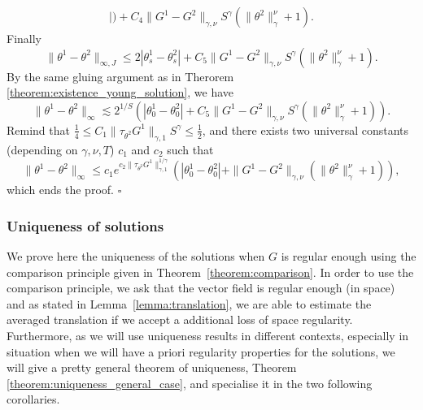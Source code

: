 \documentclass[a4paper,11pt]{article}
\newenvironment{proof}{{\sc Proof.}}{\hfill$\square$}
\begin{document}
\begin{proof}
\begin{eqnarray*}
    | ) +C_{4} \| G^{1} -G^{2} \|_{\gamma , \nu} S^{\gamma} ( \| \theta^{2}
    \|^{\nu}_{\gamma} +1 ) .
  \end{eqnarray*}
  Finally
  \[ \| \theta^{1} - \theta^{2} \|_{\infty ,J} \leqslant 2 | \theta^{1}_{s} -
     \theta^{2}_{s} | +C_{5} \| G^{1} -G^{2} \|_{\gamma , \nu} S^{\gamma} ( \|
     \theta^{2} \|^{\nu}_{\gamma} +1 ) . \]
  By the same gluing argument as in Therorem
  \ref{theorem:existence_young_solution}, we have
  \[ \| \theta^{1} - \theta^{2} \|_{\infty} \lesssim 2^{1/S} ( |
     \theta^{1}_{0} - \theta^{2}_{0} | +C_{5} \| G^{1} -G^{2} \|_{\gamma ,
     \nu} S^{\gamma} ( \| \theta^{2} \|^{\nu}_{\gamma} +1 ) ) . \]
  Remind that $\frac{1}{4} \leqslant C_{1} \| \tau_{\theta^{2}} G^{1}
  \|_{\gamma ,1} S^{\gamma} \leqslant \frac{1}{2}$, and there exists two
  universal constants (depending on $\gamma , \nu ,T$) $c_{1}$ and $c_{2}$
  such that
  \[ \| \theta^{1} - \theta^{2} \|_{\infty} \leqslant c_{1} e^{c_{2} \|
     \tau_{\theta^{2}} G^{1} \|_{\gamma ,1}^{1/ \gamma}} ( | \theta^{1}_{0} -
     \theta^{2}_{0} | + \| G^{1} -G^{2} \|_{\gamma , \nu} ( \| \theta^{2}
     \|^{\nu}_{\gamma} +1 ) ), \]
  which ends the proof.
\end{proof}

\subsubsection{Uniqueness of solutions}

We prove here the uniqueness of the solutions when $G$ is regular enough using
the comparison principle given in Theorem~\ref{theorem:comparison}. In order
to use the comparison principle, we ask that the vector field is regular
enough (in space) and as stated in Lemma~\ref{lemma:translation}, we are able
to estimate the averaged translation if we accept a additional loss of space
regularity. Furthermore, as we will use uniqueness results in different
contexts, especially in situation when we will have a priori regularity
properties for the solutions, we will give a pretty general theorem of
uniqueness, Theorem \ref{theorem:uniqueness_general_case}, and specialise it in
the two following corollaries.
\end{document}

